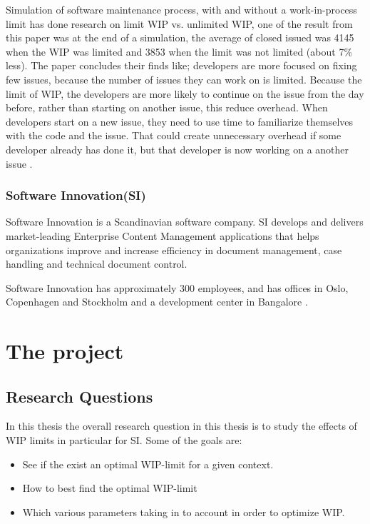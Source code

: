 \documentclass[UKenglish]{ifimaster}  %
\begin{document}
Simulation of software maintenance process, with and without a work-in-process limit has done research on limit WIP vs. unlimited WIP, one of the result from this paper was at the end of a simulation, the average of closed issued was 4145 when the WIP was limited and 3853 when the limit was not limited (about 7\% less). The paper concludes their finds like; developers are more focused on fixing few issues, because the number of issues they can work on is limited.  Because the limit of WIP, the developers are more likely to continue on the issue from the day before, rather than starting on another issue, this reduce overhead. When developers start on a new issue, they need to use time to familiarize themselves with the code and the issue. That could create unnecessary overhead if some developer already has done it, but that developer is now working on a another issue \parencite{SMR:SMR1599}.

\section{Software Innovation(SI)}
Software Innovation is a Scandinavian software company. SI develops and delivers market-leading Enterprise Content Management applications that helps organizations improve and increase efficiency in document management, case handling and technical document control.

Software Innovation has approximately 300 employees, and has offices in Oslo, Copenhagen and Stockholm and a development center in Bangalore \parencite{SI}.


\part{The project}                    %
\chapter{Research Questions}
In this thesis the overall research question in this thesis is to study the effects of WIP limits in particular for SI. Some of the goals are:
\begin{itemize} 
\item See if the exist an optimal WIP-limit for a given context.
\item How to best find the optimal WIP-limit
\item Which various parameters taking in to account in order to optimize WIP. 
\end{itemize}
\end{document}
